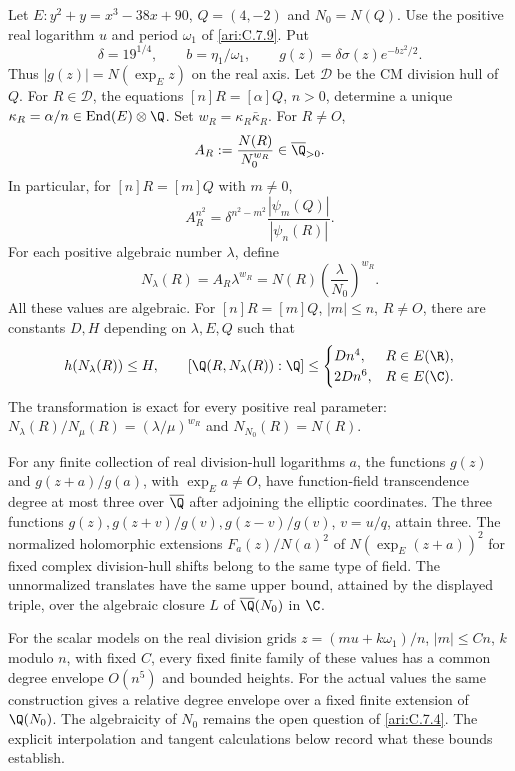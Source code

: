 \begin{proposition}
Let $E:y^2+y=x^3-38x+90$, $Q=(4,-2)$ and $N_0=N(Q)$.
Use the positive real logarithm $u$ and period $\omega_1$ of
\ref{ari:C.7.9}. Put
\[
 \delta=19^{1/4},\qquad b=\eta_1/\omega_1,\qquad
 g(z)=\delta\sigma(z)e^{-bz^2/2}.
\]
Thus $|g(z)|=N(\exp_Ez)$ on the real axis. Let $\mathcal D$
be the CM division hull of $Q$. For $R\in\mathcal D$, the
equations $[n]R=[\alpha]Q$, $n>0$, determine a unique
$\kappa_R=\alpha/n\in\operatorname{End}(E)\otimes\Q$.
Set $w_R=\kappa_R\bar\kappa_R$. For $R\ne O$,
\[
 A_R:=\frac{N(R)}{N_0^{w_R}}\in\overline\Q_{>0}.
\]
In particular, for $[n]R=[m]Q$ with $m\ne0$,
\begin{equation}\label{ari:eq:division-ratio-model}
 A_R^{n^2}=\delta^{n^2-m^2}
                  \frac{|\psi_m(Q)|}{|\psi_n(R)|}.
\end{equation}
For each positive algebraic number $\lambda$, define
\[
 N_\lambda(R)=A_R\lambda^{w_R}
       =N(R)\left(\frac{\lambda}{N_0}\right)^{w_R}.
\]
All these values are algebraic. For $[n]R=[m]Q$, $|m|\le n$,
$R\ne O$, there are constants $D,H$ depending on $\lambda,E,Q$
such that
\[
 h(N_\lambda(R))\le H,\qquad
 [\Q(R,N_\lambda(R)):\Q]\le
 \begin{cases}Dn^4,&R\in E(\R),\\2Dn^6,&R\in E(\C).
 \end{cases}
\]
The transformation is exact for every positive real parameter:
$N_\lambda(R)/N_\mu(R)=(\lambda/\mu)^{w_R}$ and
$N_{N_0}(R)=N(R)$.

For any finite collection of real division-hull logarithms $a$,
the functions $g(z)$ and $g(z+a)/g(a)$, with $\exp_Ea\ne O$,
have function-field transcendence degree at most three over
$\overline\Q$ after adjoining the elliptic coordinates.
The three functions $g(z),g(z+v)/g(v),g(z-v)/g(v)$, $v=u/q$,
attain three. The normalized holomorphic extensions
$F_a(z)/N(a)^2$ of $N(\exp_E(z+a))^2$ for fixed complex
division-hull shifts belong to the same type of field.
The unnormalized translates have the same upper bound, attained by
the displayed triple, over the algebraic closure $L$ of $\overline\Q(N_0)$ in $\C$.

For the scalar models on the real division grids
$z=(mu+k\omega_1)/n$, $|m|\le Cn$, $k$ modulo $n$, with
fixed $C$, every fixed finite family of these values has a common
degree envelope $O(n^5)$ and bounded heights. For the actual values the same construction
gives a relative degree envelope over a fixed finite extension
of $\Q(N_0)$. The algebraicity of $N_0$ remains the open question
of \ref{ari:C.7.4}. The explicit interpolation and tangent
calculations below record what these bounds establish.
\end{proposition}

